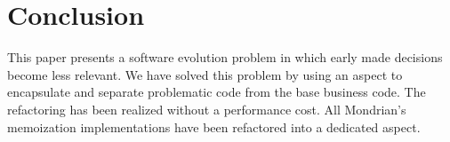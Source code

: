 \documentclass[preprint,10pt]{sigplanconf}
\newcommand{\seclabel}[1]{\label{sec:#1}}
\begin{document}
\section{Conclusion}\seclabel{conclusion}

This paper presents a software evolution problem in which early made decisions become less relevant. We have solved this problem by using an aspect to encapsulate and separate problematic code from the base business code. The refactoring has been realized without a performance cost.
All Mondrian's memoization implementations have been refactored into a dedicated aspect. 

%



\end{document}
